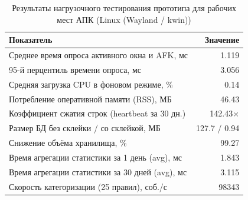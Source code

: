 \begin{table}[htbp]
\centering
\caption{Результаты нагрузочного тестирования прототипа для рабочих мест АПК (Linux (Wayland / kwin))}
\label{tab:benchmark_results}
\begin{tabular}{|l|r|}
\hline
\textbf{Показатель} & \textbf{Значение} \\ \hline
Среднее время опроса активного окна и AFK, мс & 1.119 \\ \hline
95-й перцентиль времени опроса, мс & 3.056 \\ \hline
Средняя загрузка CPU в фоновом режиме, \% & 0.14 \\ \hline
Потребление оперативной памяти (RSS), МБ & 46.43 \\ \hline
Коэффициент сжатия строк (heartbeat за 30 дн.) & 142.43$\times$ \\ \hline
Размер БД без склейки / со склейкой, МБ & 127.7 / 0.94 \\ \hline
Снижение объёма хранилища, \% & 99.27 \\ \hline
Время агрегации статистики за 1 день (avg), мс & 1.843 \\ \hline
Время агрегации статистики за 30 дней (avg), мс & 3.115 \\ \hline
Скорость категоризации (25 правил), соб./с & 98343 \\ \hline
\end{tabular}
\end{table}
